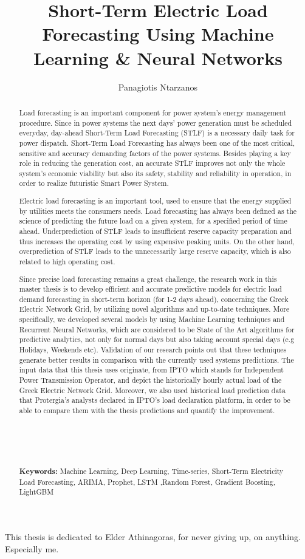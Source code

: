\documentclass[a4paper, twoside]{report}
\title{Short-Term Electric Load Forecasting Using Machine Learning \& Neural Networks}
\author{Panagiotis Ntarzanos}
\begin{document}

\vspace*{\fill}
\begingroup
\centering
This thesis is dedicated to Elder Athinagoras, for never giving up, on anything. Especially me.
\endgroup
\vspace*{\fill}
\begin{abstract}
\par Load forecasting is an important component for power system's energy management procedure. Since in power systems the next days’ power generation must be scheduled everyday, day-ahead Short-Term Load Forecasting (STLF) is a necessary daily task for power dispatch. Short-Term Load Forecasting has always been one of the most critical, sensitive and accuracy demanding factors of the power systems.  Besides playing a key role in reducing the generation cost, an accurate STLF improves not only the whole system’s economic viability but also its safety, stability and reliability in operation, in order to realize futuristic Smart Power System. 
\par
Electric load forecasting is an important tool, used to ensure that the energy supplied by utilities meets the consumers needs. Load forecasting has always been defined as the science of predicting the future load on a given system, for a specified period of time ahead. Underprediction of STLF leads to insufficient reserve capacity preparation and thus increases the operating cost by using expensive peaking units. On the other hand, overprediction of STLF leads to the unnecessarily large reserve capacity, which is also related to high operating cost. 
\par Since precise load forecasting remains a great challenge, the research work in this master thesis is to  develop efficient and accurate predictive models for electric load demand forecasting in short-term horizon (for 1-2 days ahead), concerning the Greek Electric Network Grid,  by utilizing novel algorithms and up-to-date techniques. More specifically, we developed several models by using Machine Learning techniques and Recurrent Neural Networks, which are considered to be State of the Art algorithms for predictive analytics, not only for normal days but also taking account special days (e.g Holidays, Weekends etc). Validation of our research points out that these techniques generate better results in comparison with the currently used systems predictions. The input data that this thesis uses originate, from IPTO which stands for Independent Power Transmission Operator, and depict the historically hourly actual load of the Greek Electric Network Grid. Moreover, we also used historical load prediction data that Protergia's analysts declared in IPTO's load declaration platform, in order to be able to compare them with the thesis predictions and quantify the improvement.
\\
\\
\\
\\
\\
\\
\textbf{Keywords:} Machine Learning, Deep Learning, Time-series, Short-Term Electricity Load Forecasting, ARIMA, Prophet, LSTM ,Random Forest, Gradient Boosting, LightGBM
\end{abstract}
\end{document}

